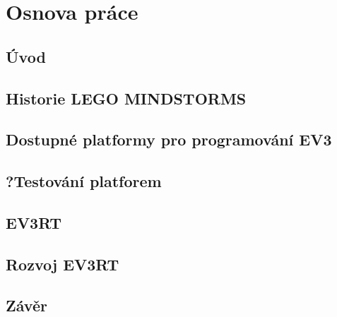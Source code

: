 \chapter{Osnova práce}
\section{Úvod}
\section{Historie LEGO MINDSTORMS}
\section{Dostupné platformy pro programování EV3}
\section{?Testování platforem}
\section{EV3RT}
\section{Rozvoj EV3RT}
\section{Závěr}